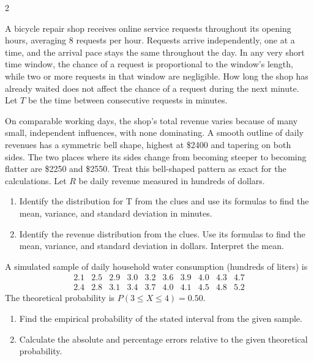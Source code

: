 \begin{multicols}{2}
\newpage

A bicycle repair shop receives online service requests throughout its opening
hours, averaging 8 requests per hour. Requests arrive independently, one at
a time, and the arrival pace stays the same throughout the day. In any very
short time window, the chance of a request is proportional to the window's
length, while two or more requests in that window are negligible. How long
the shop has already waited does not affect the chance of a request during
the next minute. Let $T$ be the time between consecutive requests in minutes.

On comparable working days, the shop's total revenue varies because of many
small, independent influences, with none dominating. A smooth outline of
daily revenues has a symmetric bell shape, highest at \$2400 and tapering
on both sides. The two places where its sides change from becoming steeper
to becoming flatter are \$2250 and \$2550. Treat this bell-shaped pattern
as exact for the calculations. Let $R$ be daily revenue measured in hundreds
of dollars.
\begin{enumerate}[label=\textbf{(\alph*)}]
\item Identify the distribution for T from the clues and use its formulas to find the mean, variance, and standard deviation in minutes. 
\item Identify the revenue distribution from the clues. Use its formulas to find the mean, variance, and standard deviation in dollars. Interpret the mean. 
\end{enumerate}

A simulated sample of daily household water consumption (hundreds of liters) is
\[
\begin{array}{cccccccccc}
2.1&2.5&2.9&3.0&3.2&3.6&3.9&4.0&4.3&4.7\\
2.4&2.8&3.1&3.4&3.7&4.0&4.1&4.5&4.8&5.2
\end{array}
\]
The theoretical probability is $P(3\le X\le4)=0.50$.
\begin{enumerate}[label=\textbf{(\alph*)}]
\item Find the empirical probability of the stated interval from the given sample. 
\item Calculate the absolute and percentage errors relative to the given theoretical probability. 
\end{enumerate}


\end{multicols}
